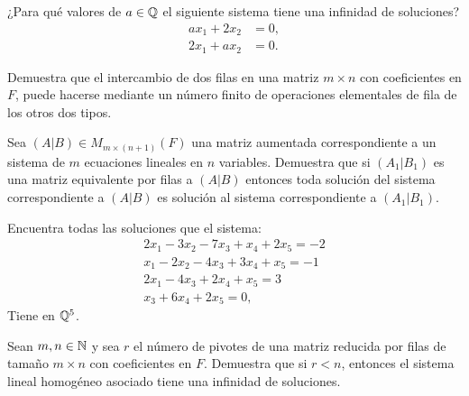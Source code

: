 \documentclass[12pt,a4paper]{book}
\begin{document}
    \begin{ejercicio}
        ¿Para qué valores de $a \in \mathbb{Q}$ el siguiente sistema tiene una infinidad de soluciones?
        \begin{align}
            ax_{1} + 2x_{2} & = 0, \tag{6.1} \label{6.1}\\
            2x_{1} + ax_{2} & = 0. \tag{6.2} \label{6.2}
        \end{align}
    \end{ejercicio}

    \begin{ejercicio}
        Demuestra que el intercambio de dos filas en una matriz $m \times n$ con coeficientes en $F$, puede hacerse mediante un número finito de operaciones elementales de fila de los otros dos tipos.
    \end{ejercicio}

    \begin{ejercicio}
        Sea $(A|B) \in M_{m \times (n+1)}(F)$ una matriz aumentada correspondiente a un sistema de $m$ ecuaciones lineales en $n$ variables. Demuestra que si $(A_1|B_1)$ es una matriz equivalente por filas a $(A|B)$ entonces toda solución del sistema correspondiente a $(A|B)$ es solución al sistema correspondiente a $(A_1|B_1)$.
    \end{ejercicio}

    \begin{ejercicio}
        Encuentra todas las soluciones que el sistema:
        \begin{align*}
            2x_1 - 3x_2 - 7x_3 + x_4 + 2x_5 = - 2\\
            x_1 - 2x_2 - 4x_3 + 3x_4 + x_5 = - 1\\
            2x_1 - 4x_3 + 2x_4 + x_5 = 3\\
            x_3 + 6x_4 + 2x_5 = 0,
        \end{align*}
        Tiene en $\mathbb{Q}^5$.
    \end{ejercicio}

    \begin{ejercicio}
        Sean $m,n \in \mathbb{N}$ y sea $r$ el número de pivotes de una matriz reducida por filas de tamaño $m \times n$ con coeficientes en $F$. Demuestra que si $r < n$, entonces el sistema lineal homogéneo asociado tiene una infinidad de soluciones.
    \end{ejercicio}
\end{document}
